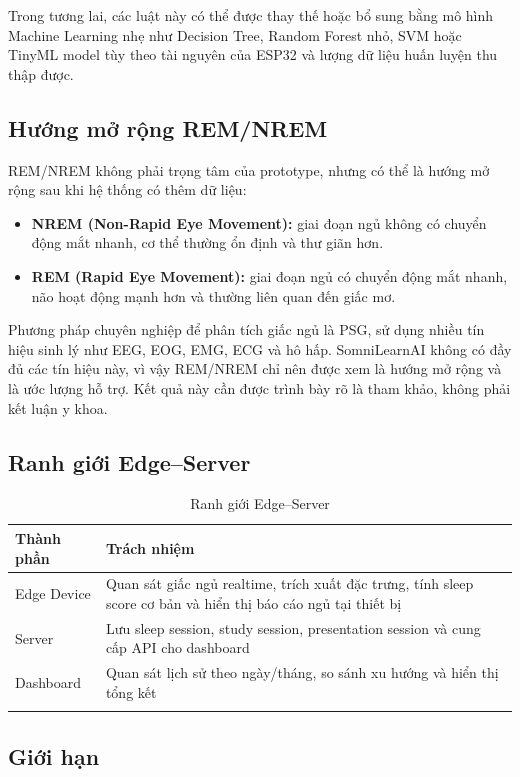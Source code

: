 \documentclass[12pt,a4paper]{article}
\begin{document}
Trong tương lai, các luật này có thể được thay thế hoặc bổ sung bằng mô hình Machine Learning nhẹ như Decision Tree, Random Forest nhỏ, SVM hoặc TinyML model tùy theo tài nguyên của ESP32 và lượng dữ liệu huấn luyện thu thập được.

\subsection{Hướng mở rộng REM/NREM}

REM/NREM không phải trọng tâm của prototype, nhưng có thể là hướng mở rộng sau khi hệ thống có thêm dữ liệu:

\begin{itemize}
    \item \textbf{NREM (Non-Rapid Eye Movement):} giai đoạn ngủ không có chuyển động mắt nhanh, cơ thể thường ổn định và thư giãn hơn.
    \item \textbf{REM (Rapid Eye Movement):} giai đoạn ngủ có chuyển động mắt nhanh, não hoạt động mạnh hơn và thường liên quan đến giấc mơ.
\end{itemize}

Phương pháp chuyên nghiệp để phân tích giấc ngủ là PSG, sử dụng nhiều tín hiệu sinh lý như EEG, EOG, EMG, ECG và hô hấp. SomniLearnAI không có đầy đủ các tín hiệu này, vì vậy REM/NREM chỉ nên được xem là hướng mở rộng và là ước lượng hỗ trợ. Kết quả này cần được trình bày rõ là tham khảo, không phải kết luận y khoa.

\subsection{Ranh giới Edge--Server}

\begin{longtable}{|P{3cm}|P{11.5cm}|}
\hline
\textbf{Thành phần} & \textbf{Trách nhiệm} \\
\hline
Edge Device & Quan sát giấc ngủ realtime, trích xuất đặc trưng, tính sleep score cơ bản và hiển thị báo cáo ngủ tại thiết bị \\
\hline
Server & Lưu sleep session, study session, presentation session và cung cấp API cho dashboard \\
\hline
Dashboard & Quan sát lịch sử theo ngày/tháng, so sánh xu hướng và hiển thị tổng kết \\
\hline
\caption{Ranh giới Edge--Server}
\end{longtable}

\subsection{Giới hạn}
\end{document}
